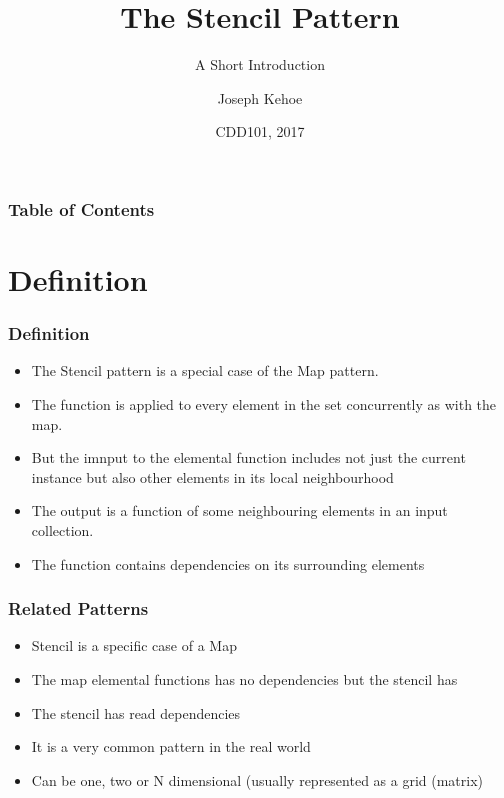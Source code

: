 \documentclass{beamer}
\title[The Stencil Pattern] %
{The Stencil Pattern}
\subtitle{A Short Introduction}
\author[Dr. Joseph Kehoe] %
{Joseph Kehoe\inst{1}}
\institute[IT Carlow] %
{
	\inst{1}%
	Department of Computing and Networking\\
	Institute of Technology Carlow
}
\date[ITC 2017] %
{CDD101, 2017}
\begin{document}
 
\frame{\titlepage}
 
 
 
 \begin{frame}
 	\frametitle{Table of Contents}
 	\tableofcontents
 \end{frame}
 
 
 \section{Definition}
\begin{frame}
\frametitle{Definition}

\begin{itemize}
	\item The Stencil pattern is a special case of the Map pattern.
	\item The function is applied to every element in the set concurrently as with the map.
	\item But the imnput to the elemental function includes not just the current instance but also other elements in its local neighbourhood
	\item The output is a function of some neighbouring elements in an input collection.
	\item The function contains dependencies on its surrounding elements
\end{itemize}
\end{frame}

\begin{frame}
	\frametitle{Related Patterns}
\begin{itemize}
\item Stencil is a specific case of a Map

\item The map elemental functions has no dependencies but the stencil has

\item The stencil has read dependencies

\item It is a very common pattern in the real world

\item Can be one, two or N dimensional (usually represented as a grid (matrix)
\end{itemize}
\end{frame}
\end{document}

